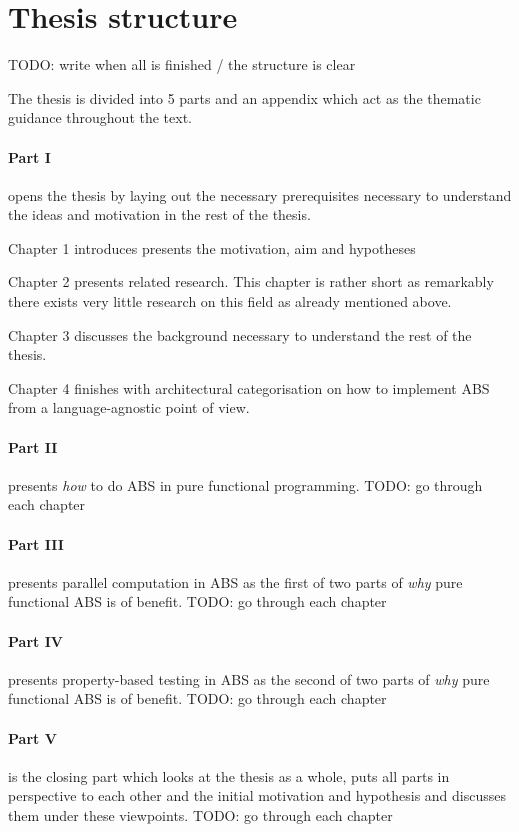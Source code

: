 \newpage

\section{Thesis structure}

TODO: write when all is finished / the structure is clear

The thesis is divided into 5 parts and an appendix which act as the thematic guidance throughout the text. 

\paragraph{Part I} opens the thesis by laying out the necessary prerequisites necessary to understand the ideas and motivation in the rest of the thesis.
\medskip

Chapter 1 introduces presents the motivation, aim and hypotheses

\medskip

Chapter 2 presents related research. This chapter is rather short as remarkably there exists very little research on this field as already mentioned above.

\medskip

Chapter 3 discusses the background necessary to understand the rest of the thesis.

\medskip

Chapter 4 finishes with architectural categorisation on how to implement ABS from a language-agnostic point of view. 

\medskip

\paragraph{Part II} presents \textit{how} to do ABS in pure functional programming. 
\medskip
TODO: go through each chapter
\medskip

\paragraph{Part III} presents parallel computation in ABS as the first of two parts of \textit{why} pure functional ABS is of benefit.
\medskip
TODO: go through each chapter

\paragraph{Part IV} presents property-based testing in ABS as the second of two parts of \textit{why} pure functional ABS is of benefit. \medskip
TODO: go through each chapter
\medskip

\paragraph{Part V} is the closing part which looks at the thesis as a whole, puts all parts in perspective to each other and the initial motivation and hypothesis and discusses them under these viewpoints.
\medskip
TODO: go through each chapter
\medskip